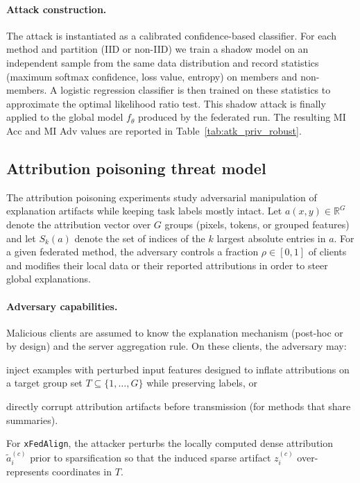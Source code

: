 \documentclass{article}
\theoremstyle{plain}
\theoremstyle{definition}
\theoremstyle{remark}
\begin{document}
\paragraph{Attack construction.}
The attack is instantiated as a calibrated confidence-based classifier. For each method and partition (IID or non-IID) we train a shadow model on an independent sample from the same data distribution and record statistics (maximum softmax confidence, loss value, entropy) on members and non-members. A logistic regression classifier is then trained on these statistics to approximate the optimal likelihood ratio test. This shadow attack is finally applied to the global model $f_{\theta}$ produced by the federated run. The resulting MI Acc and MI Adv values are reported in Table~\ref{tab:atk_priv_robust}.

\subsection{Attribution poisoning threat model}

The attribution poisoning experiments study adversarial manipulation of explanation artifacts while keeping task labels mostly intact. Let $a(x,y)\in\mathbb{R}^{G}$ denote the attribution vector over $G$ groups (pixels, tokens, or grouped features) and let $S_k(a)$ denote the set of indices of the $k$ largest absolute entries in $a$. For a given federated method, the adversary controls a fraction $\rho\in[0,1]$ of clients and modifies their local data or their reported attributions in order to steer global explanations.

\paragraph{Adversary capabilities.}
Malicious clients are assumed to know the explanation mechanism (post-hoc or by design) and the server aggregation rule. On these clients, the adversary may: \begin{enumerate*}[label=(\roman*)]
\item inject examples with perturbed input features designed to inflate attributions on a target group set $T\subseteq \{1,\dots,G\}$ while preserving labels, or
\item directly corrupt attribution artifacts before transmission (for methods that share summaries).
\end{enumerate*}
For \texttt{xFedAlign}, the attacker perturbs the locally computed dense attribution $\tilde{a}_i^{(c)}$ prior to sparsification so that the induced sparse artifact $z_i^{(c)}$ over-represents coordinates in $T$.
\end{document}
